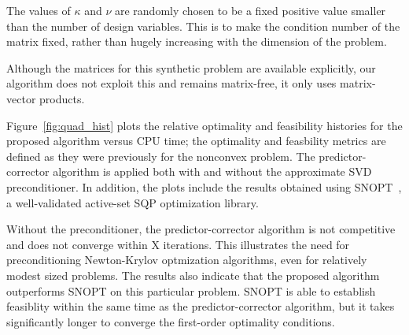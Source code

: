 
The values of $\kappa$ and $\nu$ are randomly chosen to be a fixed positive
value smaller than the number of design variables.  This is to make the
condition number of the matrix fixed, rather than hugely increasing with the
dimension of the problem.

\begin{remark}
Although the matrices for this synthetic problem are available explicitly, our
algorithm does not exploit this and remains matrix-free, \ie it only uses
matrix-vector products.
\end{remark}

Figure~\ref{fig:quad_hist} plots the relative optimality and feasibility
histories for the proposed algorithm versus CPU time; the optimality and
feasbility metrics are defined as they were previously for the nonconvex
problem.  The predictor-corrector algorithm is applied both with and without the
approximate SVD preconditioner.  In addition, the plots include the results
obtained using SNOPT~\cite{gill:2002}, a well-validated active-set SQP
optimization library.

Without the preconditioner, the predictor-corrector algorithm is not competitive
and does not converge within X iterations.  This illustrates the need for preconditioning Newton-Krylov
optmization algorithms, even for relatively modest sized problems.  The results
also indicate that the proposed algorithm outperforms SNOPT on this particular
problem.  SNOPT is able to establish feasiblity within the same time as the
predictor-corrector algorithm, but it takes significantly longer to converge the
first-order optimality conditions.

